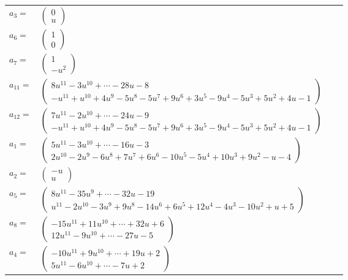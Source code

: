 \documentclass[1p]{elsarticle_modified}
\theoremstyle{definition}
\begin{document}
\begin{tabular}{m{7pt} m{180pt} m{7pt} m{180pt} }
\flushright $a_{3}=$&$\begin{pmatrix}0\\u\end{pmatrix}$ \\
\flushright $a_{6}=$&$\begin{pmatrix}1\\0\end{pmatrix}$ \\
\flushright $a_{7}=$&$\begin{pmatrix}1\\- u^2\end{pmatrix}$ \\
\flushright $a_{11}=$&$\begin{pmatrix}8 u^{11}-3 u^{10}+\cdots-28 u-8\\- u^{11}+u^{10}+4 u^9-5 u^8-5 u^7+9 u^6+3 u^5-9 u^4-5 u^3+5 u^2+4 u-1\end{pmatrix}$ \\
\flushright $a_{12}=$&$\begin{pmatrix}7 u^{11}-2 u^{10}+\cdots-24 u-9\\- u^{11}+u^{10}+4 u^9-5 u^8-5 u^7+9 u^6+3 u^5-9 u^4-5 u^3+5 u^2+4 u-1\end{pmatrix}$ \\
\flushright $a_{1}=$&$\begin{pmatrix}5 u^{11}-3 u^{10}+\cdots-16 u-3\\2 u^{10}-2 u^9-6 u^8+7 u^7+6 u^6-10 u^5-5 u^4+10 u^3+9 u^2- u-4\end{pmatrix}$ \\
\flushright $a_{2}=$&$\begin{pmatrix}- u\\u\end{pmatrix}$ \\
\flushright $a_{5}=$&$\begin{pmatrix}8 u^{11}-35 u^9+\cdots-32 u-19\\u^{11}-2 u^{10}-3 u^9+9 u^8-14 u^6+6 u^5+12 u^4-4 u^3-10 u^2+u+5\end{pmatrix}$ \\
\flushright $a_{8}=$&$\begin{pmatrix}-15 u^{11}+11 u^{10}+\cdots+32 u+6\\12 u^{11}-9 u^{10}+\cdots-27 u-5\end{pmatrix}$ \\
\flushright $a_{4}=$&$\begin{pmatrix}-10 u^{11}+9 u^{10}+\cdots+19 u+2\\5 u^{11}-6 u^{10}+\cdots-7 u+2\end{pmatrix}$ \\

\end{tabular}
\end{document}
